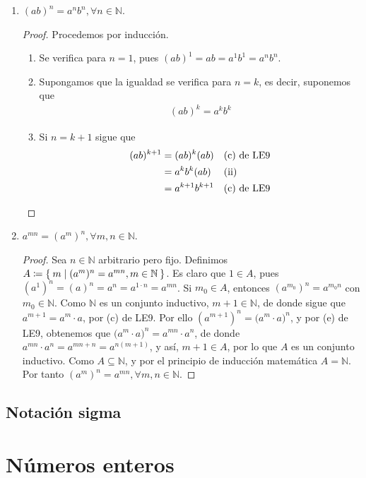 \documentclass[11pt]{article}
\newcommand{\N}{\mathbb{N}}
\newcommand{\defined}{\coloneqq}
\let\set\Set
\begin{document}
\begin{enumerate}[label=\alph*)]
 \item $(ab)^n = a^nb^n, \forall n\in \N$.
 \begin{proof}
  Procedemos por inducción. \begin{enumerate}[label=\roman*)]
    \item Se verifica para $n=1$, pues $(ab)^1=ab=a^1b^1=a^nb^n$.
    \item Supongamos que la igualdad se verifica para $n=k$, es decir, suponemos que \begin{align*}
      (ab)^k = a^kb^k
    \end{align*}
    \item Si $n=k+1$ sigue que \begin{align*}
      (ab)^{k+1} &= (ab)^k (ab) && \text{(c) de LE9}\\
      &= a^kb^k (ab) && \text{(ii)}\\
      &= a^{k+1} b^{k+1} && \text{(c) de LE9} \qedhere 
    \end{align*}
  \end{enumerate}
 \end{proof}

 \item $a^{mn} = (a^m)^n, \forall m,n\in \N$.
 \begin{proof}
  Sea $n\in \N$ arbitrario pero fijo. Definimos $A\defined \set{m|(a^m)^n = a^{mn}, m\in \N}$. Es claro que $1\in A$, pues $(a^1)^n = (a)^n = a^n = a^{1\cdot n} = a^{mn}$. Si $m_0\in A$, entonces $(a^{m_0})^n = a^{m_0n}$ con $m_0\in \N$. Como $\N$ es un conjunto inductivo, $m+1\in \N$, de donde sigue que $a^{m+1} = a^m\cdot a$, por (c) de LE9. Por ello $(a^{m+1})^n = \big(a^m\cdot a\big)^n$, y por (e) de LE9, obtenemos que $\big(a^m\cdot a\big)^n = a^{mn}\cdot a^n$, de donde $a^{mn}\cdot a^n = a^{mn+n} = a^{n(m+1)}$, y así, $m+1\in A$, por lo que $A$ es un conjunto inductivo. Como $A\subseteq \N$, y por el principio de inducción matemática $A=\N$. Por tanto $(a^m)^n = a^{mn}, \forall m,n\in \N$.
 \end{proof}

 \end{enumerate}

 \subsection*{Notación sigma}

 

 \section*{Números enteros}
\end{document}
